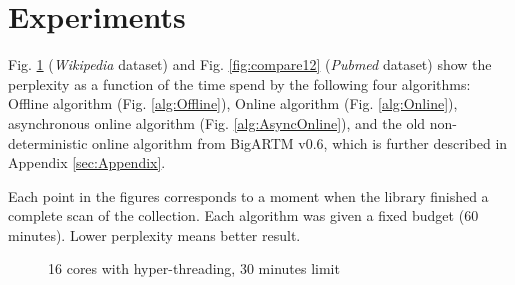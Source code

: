 \documentclass[russian,english]{llncs}
\newcommand{\kw}[1]{\textsf{#1}}
\begin{document}
\section{Experiments}
\label{sec:Experiments}

Fig. \ref{fig:compare16} (\emph{Wikipedia} dataset) and Fig. \ref{fig:compare12} (\emph{Pubmed} dataset)
show the perplexity as a function of the time spend by the following four algorithms:
\kw{Offline algorithm} (Fig. \ref{alg:Offline}),
\kw{Online algorithm} (Fig. \ref{alg:Online}),
asynchronous online algorithm (Fig. \ref{alg:AsyncOnline}),
and the old non-deterministic online algorithm from \kw{BigARTM v0.6}, which is further described in Appendix \ref{sec:Appendix}.

Each point in the figures corresponds to a moment when the library finished a complete scan of the collection.
Each algorithm was given a fixed budget (60 minutes).
Lower perplexity means better result.

\begin{figure}
\centering
{}
    \caption{16 cores with hyper-threading, 30 minutes limit} \label{fig:compare16}
\end{figure}
\end{document}

